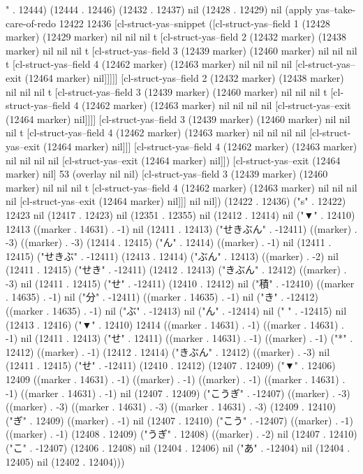 " . 12444) (12444 . 12446) (12432 . 12437) nil (12428 . 12429) nil (apply yas--take-care-of-redo 12422 12436 [cl-struct-yas--snippet ([cl-struct-yas--field 1 (12428 marker) (12429 marker) nil nil nil t [cl-struct-yas--field 2 (12432 marker) (12438 marker) nil nil nil t [cl-struct-yas--field 3 (12439 marker) (12460 marker) nil nil nil t [cl-struct-yas--field 4 (12462 marker) (12463 marker) nil nil nil nil [cl-struct-yas--exit (12464 marker) nil]]]]] [cl-struct-yas--field 2 (12432 marker) (12438 marker) nil nil nil t [cl-struct-yas--field 3 (12439 marker) (12460 marker) nil nil nil t [cl-struct-yas--field 4 (12462 marker) (12463 marker) nil nil nil nil [cl-struct-yas--exit (12464 marker) nil]]]] [cl-struct-yas--field 3 (12439 marker) (12460 marker) nil nil nil t [cl-struct-yas--field 4 (12462 marker) (12463 marker) nil nil nil nil [cl-struct-yas--exit (12464 marker) nil]]] [cl-struct-yas--field 4 (12462 marker) (12463 marker) nil nil nil nil [cl-struct-yas--exit (12464 marker) nil]]) [cl-struct-yas--exit (12464 marker) nil] 53 (overlay nil nil) [cl-struct-yas--field 3 (12439 marker) (12460 marker) nil nil nil t [cl-struct-yas--field 4 (12462 marker) (12463 marker) nil nil nil nil [cl-struct-yas--exit (12464 marker) nil]]] nil nil]) (12422 . 12436) ("s" . 12422) 12423 nil (12417 . 12423) nil (12351 . 12355) nil (12412 . 12414) nil ("▼" . 12410) 12413 ((marker . 14631) . -1) nil (12411 . 12413) ("せきぶん" . -12411) ((marker) . -3) ((marker) . -3) (12414 . 12415) ("ん" . 12414) ((marker) . -1) nil (12411 . 12415) ("せきぶ" . -12411) (12413 . 12414) ("ぶん" . 12413) ((marker) . -2) nil (12411 . 12415) ("せき" . -12411) (12412 . 12413) ("きぶん" . 12412) ((marker) . -3) nil (12411 . 12415) ("せ" . -12411) (12410 . 12412) nil ("積" . -12410) ((marker . 14635) . -1) nil ("分" . -12411) ((marker . 14635) . -1) nil ("き" . -12412) ((marker . 14635) . -1) nil ("ぶ" . -12413) nil ("ん" . -12414) nil (" " . -12415) nil (12413 . 12416) ("▼" . 12410) 12414 ((marker . 14631) . -1) ((marker . 14631) . -1) nil (12411 . 12413) ("せ" . 12411) ((marker . 14631) . -1) ((marker) . -1) ("*" . 12412) ((marker) . -1) (12412 . 12414) ("きぶん" . 12412) ((marker) . -3) nil (12411 . 12415) ("せ" . -12411) (12410 . 12412) (12407 . 12409) ("▼" . 12406) 12409 ((marker . 14631) . -1) ((marker) . -1) ((marker) . -1) ((marker . 14631) . -1) ((marker . 14631) . -1) nil (12407 . 12409) ("こうぎ" . -12407) ((marker) . -3) ((marker) . -3) ((marker . 14631) . -3) ((marker . 14631) . -3) (12409 . 12410) ("ぎ" . 12409) ((marker) . -1) nil (12407 . 12410) ("こう" . -12407) ((marker) . -1) ((marker) . -1) (12408 . 12409) ("うぎ" . 12408) ((marker) . -2) nil (12407 . 12410) ("こ" . -12407) (12406 . 12408) nil (12404 . 12406) nil ("あ" . -12404) nil (12404 . 12405) nil (12402 . 12404)))
